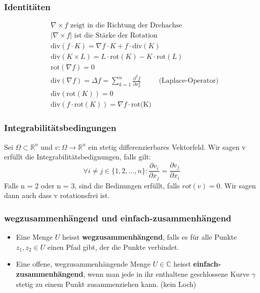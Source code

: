 \documentclass[8pt, a4paper, landscape, fleqn]{scrartcl}
\begin{document}
\begin{multicols*}{3}
					
				\subsubsection{Identitäten}
					\begin{align*}
					    &\nabla \times f \text{ zeigt in die Richtung der Drehachse} \\
					    &|\nabla \times f| \text{ ist die Stärke der Rotation} \\
						&\text{div}(f\cdot K)=\nabla f \cdot K+f \cdot \text{div}(K)\\
						&\text{div}(K\times L)=L\cdot \text{rot}(K)-K\cdot \text{rot}(L)\\
						&\text{rot}(\nabla f)=0\\
						&\text{div}(\nabla f)=\Delta f=\sum_{k=1}^{n}\frac{\partial^2 f}{\partial x_k^2} \hspace{30pt} \text{(Laplace-Operator)}\\
						&\text{div}(\text{rot}(K))=0\\
						&\text{div}(f\cdot \text{rot}(K))=\nabla f \cdot \text{rot(K)}
					\end{align*}
				\subsubsection{Integrabilitätsbedingungen}
				    Sei $\Omega\subset \mathbb{R}^n$ und $v:\Omega\rightarrow\mathbb{R}^n$ ein stetig differenzierbares Vektorfeld. Wir sagen v erfüllt die Integrabilitätsbedignungen, falls gilt:
				    \[\forall i \neq j \in \{1,2,...,n\}:\frac{\partial v_i}{\partial x_j} = \frac{\partial v_j}{\partial x_i}\]
				    Falls n = 2 oder n = 3, sind die Bedinungen erfüllt, falls $rot(v) = 0$. Wir sagen dann auch dass v rotationsfrei ist.
				\subsubsection{wegzusammenhängend und einfach-zusammenhängend}
				    \begin{itemize}
				        \item Eine Menge $U$ heisst \textbf{wegzusammenhängend}, falls es für alle Punkte $z_1,z_2 \in U$ einen Pfad gibt, der die Punkte verbindet.
				        \item Eine offene, wegzusammenhängende Menge $U \in \mathbb{C}$ heisst \textbf{einfach-zusammenhängend}, wenn man jede in ihr enthaltene geschlossene Kurve $\gamma$ stetig zu einem Punkt zusammenziehen kann. (kein Loch)
				    \end{itemize}

\end{multicols*}
\end{document}
